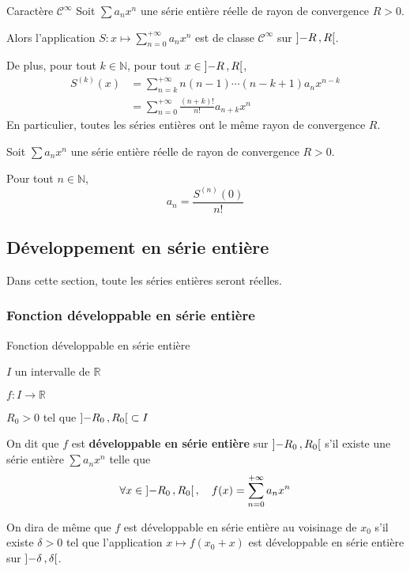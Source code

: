     \begin{theo}{Caractère $\mathcal{C}^{\infty}$}
        Soit $\sum a_n x^n$ une série entière \textcolor{myred}{réelle} de rayon de convergence $R > 0$. 

        Alors l’application $S : x \mapsto \sum_{n=0}^{+\infty} a_n x^n$ est de classe $\mathcal{C}^{\infty}$ sur $\left] -R \, , R \right[$.

        De plus, pour tout $k \in \mathbb{N}$, pour tout $x \in \left] -R \, , R \right[$,
        \begin{align*}
            S^{(k)}(x) 
            &= \sum_{n=k}^{+\infty} n(n-1) \cdots (n-k+1) a_n x^{n-k} \\
            &= \sum_{n=0}^{+\infty} \frac{(n+k)!}{n!} a_{n+k} x^n
        \end{align*}
        En particulier, toutes les séries entières ont le même rayon de convergence $R$.
    \end{theo}

    \begin{coro}{}{}
        Soit $\sum a_n x^n$ une série entière \textcolor{myorange}{réelle} de rayon de convergence $R > 0$. 

        Pour tout $n \in \mathbb{N}$, 
        \[ a_n = \frac{S^{(n)}(0)}{n!} \]   
    \end{coro}

\subsection{Développement en série entière}

    Dans cette section, toute les séries entières seront réelles.

    \subsubsection{Fonction développable en série entière}

    \begin{defi}{Fonction développable en série entière}{}
        \begin{soit}
            \item $I$ un intervalle de $\mathbb{R}$
            \item $f : I \to \mathbb{R}$
            \item $R_0 > 0$ tel que $\left] -R_0 \, , R_0 \right[ \subset I$
        \end{soit}
        On dit que $f$ est \textbf{développable en série entière} sur $\left] -R_0 \, , R_0 \right[$ s’il existe une série entière $\sum a_n x^n$ telle que 
        \[ \forall x \in \left] -R_0 \, , R_0 \right[, \quad f(x) = \sum_{n=0}^{+\infty} a_n x^n \]

        On dira de même que $f$ est développable en série entière au voisinage de $x_0$ s’il existe $\delta > 0$ tel que l’application $x \longmapsto f(x_0 + x)$ est développable en série entière sur $\left] -\delta \, , \delta \right[$.
    \end{defi}

